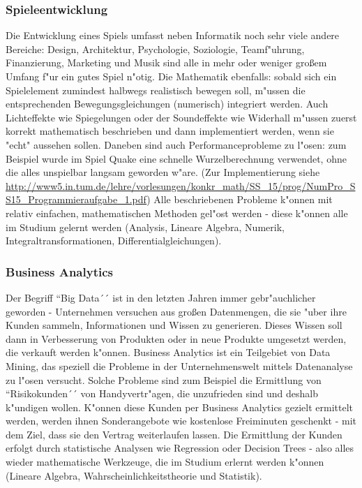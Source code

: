 \subsubsection{Spieleentwicklung}
Die Entwicklung eines Spiels umfasst neben Informatik noch sehr viele andere Bereiche: Design, Architektur, Psychologie, Soziologie, Teamf"uhrung, Finanzierung, Marketing und Musik sind alle in mehr oder weniger gro\ss em Umfang f"ur ein gutes Spiel n"otig. Die Mathematik ebenfalls: sobald sich ein Spielelement zumindest halbwegs realistisch bewegen soll, m"ussen die entsprechenden Bewegungsgleichungen (numerisch) integriert werden. Auch Lichteffekte wie Spiegelungen oder der Soundeffekte wie Widerhall m"ussen zuerst korrekt mathematisch beschrieben und dann implementiert werden, wenn sie "echt" aussehen sollen. Daneben sind auch Performanceprobleme zu l"osen: zum Beispiel wurde im Spiel Quake eine schnelle Wurzelberechnung verwendet, ohne die alles unspielbar langsam geworden w"are. (Zur Implementierung siehe \url{http://www5.in.tum.de/lehre/vorlesungen/konkr_math/SS_15/prog/NumPro_SS15_Programmieraufgabe_1.pdf})
Alle beschriebenen Probleme k"onnen mit relativ einfachen, mathematischen Methoden gel"ost werden - diese k"onnen alle im Studium gelernt werden (Analysis, Lineare Algebra, Numerik, Integraltransformationen, Differentialgleichungen).

\subsubsection{Business Analytics}
Der Begriff ``Big Data´´ ist in den letzten Jahren immer gebr"auchlicher geworden - Unternehmen versuchen aus gro\ss en Datenmengen, die sie "uber ihre Kunden sammeln, Informationen und Wissen zu generieren. Dieses Wissen soll dann in Verbesserung von Produkten oder in neue Produkte umgesetzt werden, die verkauft werden k"onnen. Business Analytics ist ein Teilgebiet von Data Mining, das speziell die Probleme in der Unternehmenswelt mittels Datenanalyse zu l"osen versucht. Solche Probleme sind zum Beispiel die Ermittlung von ``Risikokunden´´ von Handyvertr"agen, die unzufrieden sind und deshalb k"undigen wollen. K"onnen diese Kunden per Business Analytics gezielt ermittelt werden, werden ihnen Sonderangebote wie kostenlose Freiminuten geschenkt - mit dem Ziel, dass sie den Vertrag weiterlaufen lassen. Die Ermittlung der Kunden erfolgt durch statistische Analysen wie Regression oder Decision Trees - also alles wieder mathematische Werkzeuge, die im Studium erlernt werden k"onnen (Lineare Algebra, Wahrscheinlichkeitstheorie und Statistik).


